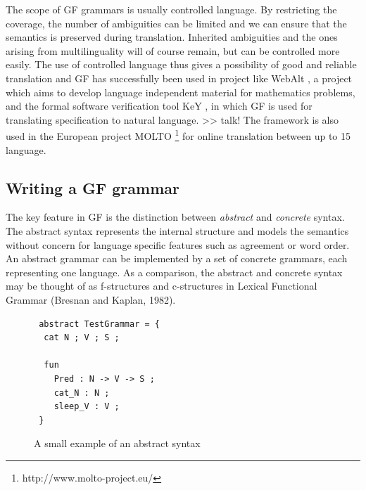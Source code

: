 \documentclass{report}
\begin{document}
\newpage %
The scope of GF grammars is usually controlled language. By
restricting the coverage, the number of ambiguities
can be limited and we can ensure that the semantics is preserved during
translation. Inherited ambiguities and the ones arising from multilinguality will
of course remain, but can be controlled more easily. %
The use of controlled language thus gives a possibility of good and reliable translation
and GF has successfully been used in project like %
WebAlt \cite{webalt}, a project which aims to develop language independent
material for mathematics problems, and the formal software verification tool
KeY \cite{key}, in which GF is used for translating specification to natural language.
>> talk!
The framework is also used in the
European project MOLTO \footnote{http://www.molto-project.eu/} for online
translation between up to 15 language.\\


\subsection{Writing a GF grammar}
The key feature in GF is the distinction between
\textit{abstract} and \textit{concrete} syntax. The abstract syntax represents
the internal structure and models the semantics without concern for language
specific features such as agreement or word order.
An abstract grammar can be implemented by a set of concrete grammars, each
representing one language. As a comparison, the abstract and concrete syntax
may be thought of as f-structures and c-structures in Lexical Functional Grammar (Bresnan and Kaplan, 1982).

\begin{figure}[h]
\begin{verbatim}
 abstract TestGrammar = {
  cat N ; V ; S ;

  fun 
    Pred : N -> V -> S ;
    cat_N : N ;
    sleep_V : V ;
 }
\end{verbatim}
\caption{A small example of an abstract syntax}
\label{fig:gfAbstract1}
\end{figure}
\end{document}
